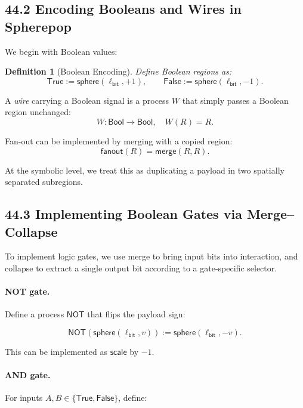 \documentclass[12pt,letterpaper]{article}
\newtheorem{definition}[theorem]{Definition}
\theoremstyle{remark}
\begin{document}
\subsection{44.2 Encoding Booleans and Wires in Spherepop}

We begin with Boolean values:

\begin{definition}[Boolean Encoding]
Define Boolean regions as:
\[
\mathsf{True}  := \mathsf{sphere}(\ell_{\mathsf{bit}}, +1), \qquad
\mathsf{False} := \mathsf{sphere}(\ell_{\mathsf{bit}}, -1).
\]
\end{definition}

A \emph{wire} carrying a Boolean signal is a process $W$ that simply passes a Boolean region unchanged:
\[
W : \mathsf{Bool} \to \mathsf{Bool}, \quad W(R) = R.
\]

Fan-out can be implemented by merging with a copied region:
\[
\mathsf{fanout}(R) = \mathsf{merge}(R, R).
\]

At the symbolic level, we treat this as duplicating a payload in two spatially separated subregions.

\subsection{44.3 Implementing Boolean Gates via Merge--Collapse}

To implement logic gates, we use merge to bring input bits into interaction, and collapse to extract a single output bit according to a gate-specific selector.

\paragraph{NOT gate.}
Define a process $\mathsf{NOT}$ that flips the payload sign:

\[
\mathsf{NOT}( \mathsf{sphere}(\ell_{\mathsf{bit}}, v)) 
:= \mathsf{sphere}(\ell_{\mathsf{bit}}, -v).
\]

This can be implemented as $\mathsf{scale}$ by $-1$.

\paragraph{AND gate.}
For inputs $A,B \in \{\mathsf{True}, \mathsf{False}\}$, define:
\end{document}
